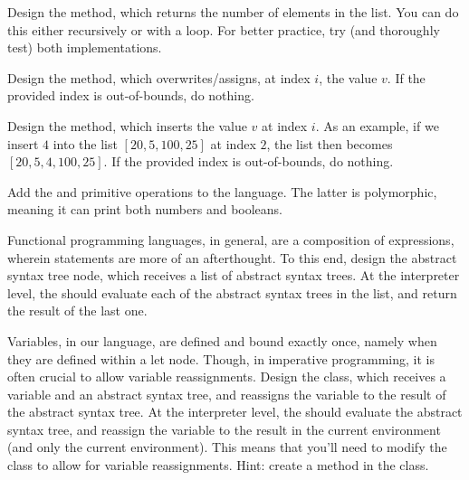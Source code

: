 
Design the  method, which returns the number of elements in the list. You can do this either recursively or with a loop. For better practice, try (and thoroughly test) both implementations.

Design the  method, which overwrites/assigns, at index $i$, the value $v$. If the provided index is out-of-bounds, do nothing.

Design the  method, which inserts the value $v$ at index $i$. As an example, if we insert $4$ into the list $[20, 5, 100, 25]$ at index $2$, the list then becomes $[20, 5, 4, 100, 25]$. If the provided index is out-of-bounds, do nothing.

Add the  and  primitive operations to the language. The latter is polymorphic, meaning it can print both numbers and booleans.

Functional programming languages, in general, are a composition of expressions, wherein statements are more of an afterthought. To this end, design the  abstract syntax tree node, which receives a list of abstract syntax trees. At the interpreter level, the  should evaluate each of the abstract syntax trees in the list, and return the result of the last one.

Variables, in our language, are defined and bound exactly once, namely when they are defined within a let node. Though, in imperative programming, it is often crucial to allow variable reassignments. Design the  class, which receives a variable and an abstract syntax tree, and reassigns the variable to the result of the abstract syntax tree. At the interpreter level, the  should evaluate the abstract syntax tree, and reassign the variable to the result in the current environment (and only the current environment). This means that you'll need to modify the  class to allow for variable reassignments. Hint: create a  method in the  class.

